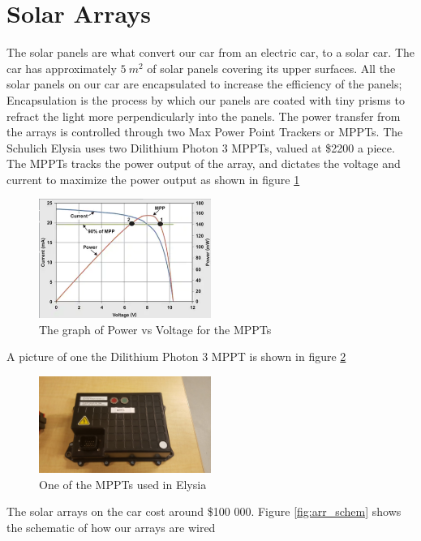 \documentclass{article}
\begin{document}
    \section{Solar Arrays}
    The solar panels are what convert our car from an electric car, to a
    solar car. The car has approximately $5\ m^2$ of solar panels
    covering its upper surfaces. All the solar panels on our car are
    encapsulated to increase the efficiency of the panels; Encapsulation
    is the process by which our panels are coated with tiny prisms to
    refract the light more perpendicularly into the panels. The power
    transfer from the arrays is controlled through two Max Power Point
    Trackers or MPPTs. The Schulich Elysia uses two Dilithium Photon 3
    MPPTs, valued at \$2200 a piece. The MPPTs tracks the power output
    of the array, and dictates the voltage and current to maximize the
    power output as shown in figure \ref{fig:mppt-graph}
    \begin{figure}[H]
        \centering
        \includegraphics[width=0.5\textwidth]{images/MPPT_Diagram.png}
        \caption{The graph of Power vs Voltage for the MPPTs}
        \label{fig:mppt-graph}
    \end{figure}
    A picture of one the Dilithium Photon 3 MPPT is shown in figure
    \ref{fig:mppt}
    \begin{figure}[H]
        \centering
        \includegraphics[width=0.5\textwidth]{images/mppt.jpg}
        \caption{One of the MPPTs used in Elysia}
        \label{fig:mppt}
    \end{figure}
    The solar arrays on the car cost around \$100 000. Figure
    \ref{fig:arr_schem} shows the schematic of how our arrays are wired
\end{document}
